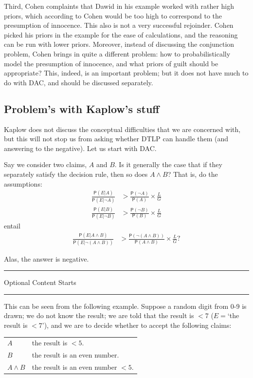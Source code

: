 \documentclass[10pt,dvipsnames,enabledeprecatedfontcommands]{scrartcl}
\newcommand{\n}{\neg}
\newcommand{\et}{\wedge}
\newcommand{\pr}[1]{\mathsf{P}(#1)}
\newcommand{\intermezzoa}{
	\begin{minipage}[c]{13cm}
	\begin{center}\rule{10cm}{0.4pt}



	\tiny{\sc Optional Content Starts}
	
	\vspace{-1mm}
	
	\rule{10cm}{0.4pt}\end{center}
	\end{minipage}\nopagebreak 
	}
\begin{document}
Third, Cohen complaints that Dawid in his example worked with rather
high priors, which according to Cohen would be too high to correspond to
the presumption of innocence. This also is not a very successful
rejoinder. Cohen picked his priors in the example for the ease of
calculations, and the reasoning can be run with lower priors. Moreover,
instead of discussing the conjunction problem, Cohen brings in quite a
different problem: how to probabilistically model the presumption of
innocence, and what priors of guilt should be appropriate? This, indeed,
is an important problem; but it does not have much to do with DAC, and
should be discussed separately.

\hypertarget{problems-with-kaplows-stuff}{%
\subsection{Problem's with Kaplow's
stuff}\label{problems-with-kaplows-stuff}}

Kaplow does not discuss the conceptual difficulties that we are
concerned with, but this will not stop us from asking whether DTLP can
handle them (and answering to the negative). Let us start with DAC.

Say we consider two claims, \(A\) and \(B\). Is it generally the case
that if they separately satisfy the decision rule, then so does
\(A\et B\)? That is, do the assumptions: \begin{align*}
 \frac{\pr{E\vert A}}{\pr{E\vert \n A}}  & > \frac{\pr{\n A}}{\pr{A}} \times \frac{L}{G}\\
 \frac{\pr{E\vert B}}{\pr{E\vert \n B}}  & > \frac{\pr{\n B}}{\pr{B}} \times \frac{L}{G}
 \end{align*} \noindent entail \begin{align*}
 \frac{\pr{E\vert A\et B}}{\pr{E\vert \n (A\et B)}}  & > \frac{\pr{\n (A\et B)}}{
 \pr{A\et B}} \times \frac{L}{G}?
 \end{align*}

Alas, the answer is negative.

\intermezzoa

This can be seen from the following example. Suppose a random digit from
0-9 is drawn; we do not know the result; we are told that the result is
\(<7\) (\(E=\)`the result is \(<7\)'), and we are to decide whether to
accept the following claims:

\begin{center}
 \begin{tabular}{@{}ll@{}}
 \toprule
 $A$ & the result is $<5$. \\
 $B$  & the result is an even number.\\
 $A\et B$ & the result is an even number $<5$. \\
 \bottomrule
 \end{tabular}
 \end{center}
\end{document}
